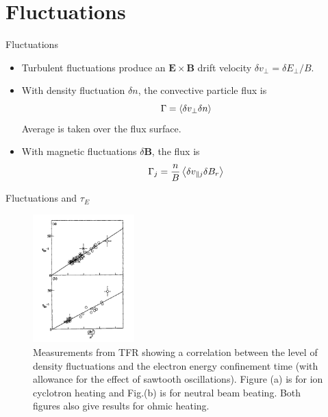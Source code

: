 \section{Fluctuations}
\begin{frame} {Fluctuations}
    \begin{itemize}
        \item Turbulent fluctuations produce an $\mathbf{E\times B}$ drift velocity $\delta v_\perp = \delta E_\perp/B$.
        \item With density fluctuation $\delta n$, the convective particle flux is
              \[ \Gamma = \expval{\delta v_\perp\delta n} \]
              Average is taken over the flux surface.
        \item With magnetic fluctuations $\delta \mathbf{B}$, the flux is
              \[ \Gamma_j = \frac{n}{B}\expval{\delta v_{\parallel j}\delta B_r} \]
    \end{itemize}
\end{frame}

\begin{frame} {Fluctuations and $\tau_E$}
    \begin{figure}
        \centering
        \includegraphics[width=0.35\textwidth]{figures/fluctuations-and-tau-e.png}
        \caption{Measurements from TFR showing a correlation between the level of density fluctuations and the electron energy confinement time (with allowance for the effect of sawtooth oscillations). Figure (a) is for ion cyclotron heating and Fig.(b) is for neutral beam beating. Both figures also give results for ohmic heating.}
        \label{fig:}
    \end{figure}
\end{frame}

